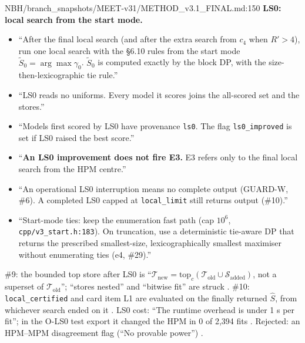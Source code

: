 \begin{stmt}{NBH/branch_snapshots/MEET-v31/METHOD_v3.1_FINAL.md:150}
\textbf{LS0: local search from the start mode.}
\begin{itemize}
\item ``After the final local search (and after the extra search from $c_4$ when $R'>4$), run one local search with the \S6.10 rules from
  the start mode $\tilde S_0=\arg\max\gamma_0$. $\tilde S_0$ is computed exactly by the block DP, with the size-then-lexicographic tie rule.''
\item ``LS0 reads no uniforms. Every model it scores joins the all-scored set and the stores.''
\item ``Models first scored by LS0 have provenance \texttt{ls0}. The flag \texttt{ls0\_improved} is set if LS0 raised the best score.''
\item ``\textbf{An LS0 improvement does not fire E3.} E3 refers only to the final local search from the HPM centre.''
\item ``An operational LS0 interruption means no complete output (GUARD-W, \#6). A completed LS0 capped at \texttt{local\_limit} still
  returns output (\#10).''
\item ``Start-mode ties: keep the enumeration fast path (cap $10^6$, \texttt{cpp/v3\_start.h:183}). On truncation, use a deterministic
  tie-aware DP that returns the prescribed smallest-size, lexicographically smallest maximiser without enumerating ties (e4, \#29).''
\end{itemize}
\end{stmt}
\#9: the bounded top store after LS0 is ``$\mathcal T_{\mathrm{new}}=\mathrm{top}_c(\mathcal T_{\mathrm{old}}\cup\mathcal S_{\mathrm{added}})$, not a
superset of $\mathcal T_{\mathrm{old}}$''; ``stores nested'' and ``bitwise fit'' are struck
. \#10: \texttt{local\_certified} and card item L1 are evaluated on
the finally returned $\hat S$, from whichever search ended on it .
LS0 cost: ``The runtime overhead is under 1 s per fit''; in the O-LS0 test export it changed the HPM in 0 of 2,394 fits
 . Rejected: an HPM--MPM
disagreement flag (``No provable power'') .

